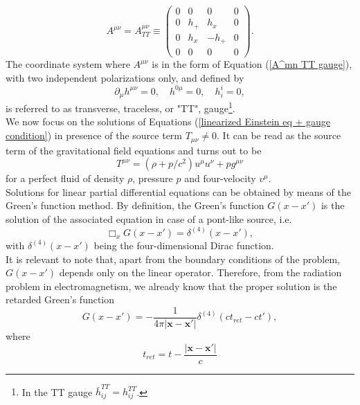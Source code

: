 \documentclass[12pt,twoside,openany]{book}
\begin{document}
\begin{equation}\label{A^mn TT gauge}
A^{\mu\nu}=A^{\mu\nu}_{TT} \equiv
\begin{pmatrix}
0 & 0 & 0 & 0 \\
0 & h_+ & h_x & 0 \\
0 & h_x & -h_+ & 0 \\
0 & 0 & 0 & 0
\end{pmatrix}.
\end{equation}
The coordinate system where $A^{\mu\nu}$ is in the form of Equation (\ref{A^mn TT gauge}), with two independent polarizations only, and defined by
\begin{equation}
    \partial_\mu h^{\mu\nu}=0, \quad h^{0\mu}=0, \quad h^i_i=0,
\end{equation}
is referred to as transverse, traceless, or "TT",  gauge\footnote{In the TT gauge $\bar{h}_{ij}^{TT}=h_{ij}^{TT}$.}.\\We now focus on the solutions of Equations (\ref{linearized Einstein eq + gauge condition}) in presence of the source term $T_{\mu\nu}\ne 0$. It can be read as the source term of the gravitational field equations and turns out to be
\begin{equation}\label{Energy-Momentum tensor def}
    T^{\mu\nu}=(\rho+p/c^2)u^\mu u^\nu+pg^{\mu\nu}
\end{equation}
for a perfect fluid of density $\rho$, pressure $p$ and four-velocity $v^\mu$.\\Solutions for linear partial differential equations  can be obtained by means of the Green's function method. By definition, the Green's function $G(x-x')$ is the solution of the associated equation in case of a pont-like source, i.e.
\begin{equation}\label{Green equation}
    \Box_x G(x-x') = \delta^{(4)}(x-x'),
\end{equation}
with $\delta^{(4)}(x-x')$ being the four-dimensional Dirac function.\\It is relevant to note that, apart from the boundary conditions of the problem, $G(x-x')$ depends only on the linear operator. Therefore, from the radiation problem in electromagnetism, we already know that the proper solution is the retarded Green's function
\begin{equation}\label{retarded Green function}
    G(x-x')=-\frac{1}{4\pi |\mathbf{x}-\mathbf{x'}|}\delta^{(4)}(ct_{ret}-ct'),
\end{equation}
where 
\begin{equation}\label{retarded time def}
    t_{ret}=t-\frac{|\mathbf{x}-\mathbf{x'}|}{c}
\end{equation}
\end{document}
